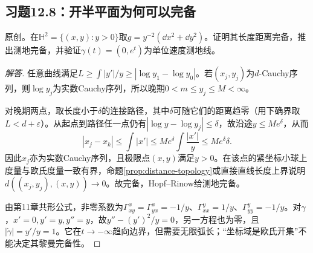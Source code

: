 \subsection*{习题12.8：开半平面为何可以完备}
原创。在$\mathbb H^2=\{(x,y):y>0\}$取$g=y^{-2}(\dd x^2+\dd y^2)$。证明其长度距离完备，推出测地完备，并验证$\gamma(t)=(0,e^t)$为单位速度测地线。
\begin{proof}[解答]
任意曲线满足$L\geq\int|y'|/y\geq|\log y_1-\log y_0|$。若$(x_j,y_j)$为$d$-Cauchy序列，则$\log y_j$为实数Cauchy序列，所以晚期$0<m\leq y_j\leq M<\infty$。

对晚期两点，取长度小于$\delta$的连接路径，其中$\delta$可随它们的距离趋零（用下确界取$L<d+\varepsilon$）。从起点到路径任一点仍有$|\log y-\log y_j|\leq\delta$，故沿途$y\leq Me^\delta$，从而
\[
 |x_j-x_k|\leq\int|x'|\leq Me^\delta\int\frac{|x'|}{y}
 \leq Me^\delta\delta.
\]
因此$x_j$亦为实数Cauchy序列，且极限点$(x,y)$满足$y>0$。在该点的紧坐标小球上度量与欧氏度量一致有界，命题\ref{prop:distance-topology}或直接直线长度上界说明$d((x_j,y_j),(x,y))\to0$。故完备，Hopf--Rinow给测地完备。

由第11章共形公式，非零系数为$\Gamma^x_{xy}=\Gamma^x_{yx}=-1/y$、$\Gamma^y_{xx}=1/y$、$\Gamma^y_{yy}=-1/y$。对$\gamma$，$x'=0,y'=y,y''=y$，故$y''-(y')^2/y=0$，另一方程也为零，且$|\dot\gamma|=y'/y=1$。它在$t\to-\infty$趋向边界，但需要无限弧长；“坐标域是欧氏开集”不能决定其黎曼完备性。
\end{proof}
